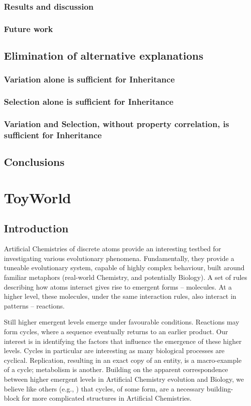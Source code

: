 \documentclass[]{report}
\begin{document}
\section{Results and discussion}
\section{Future work}

\chapter{Elimination of alternative explanations}
\section{Variation alone is sufficient for Inheritance}
\section{Selection alone is sufficient for Inheritance}
\section{Variation and Selection, without property correlation, is sufficient for Inheritance}

\chapter{Conclusions}

\part{ToyWorld}
\chapter{Introduction}\label{part-two}

Artificial Chemistries of discrete atoms provide an interesting testbed for investigating various evolutionary phenomena. Fundamentally, they provide a tuneable evolutionary system, capable of highly complex behaviour, built around familiar metaphors (real-world Chemistry, and potentially Biology). A set of rules describing how atoms interact gives rise to emergent forms -- molecules. At a higher level, these molecules, under the same interaction rules, also interact in patterns -- reactions.

Still higher emergent levels emerge under favourable conditions. Reactions may form cycles, where a sequence eventually returns to an earlier product. Our interest is in identifying the factors that influence the emergence of these higher levels. Cycles in particular are interesting as many biological processes are cyclical. Replication, resulting in an exact copy of an entity, is a macro-example of a cycle; metabolism is another. Building on the apparent correspondence between higher emergent levels in Artificial Chemistry evolution and Biology, we believe like others (e.g., \cite{Steel2013}) that cycles, of some form, are a necessary building-block for more complicated structures in Artificial Chemistries.
\end{document}
